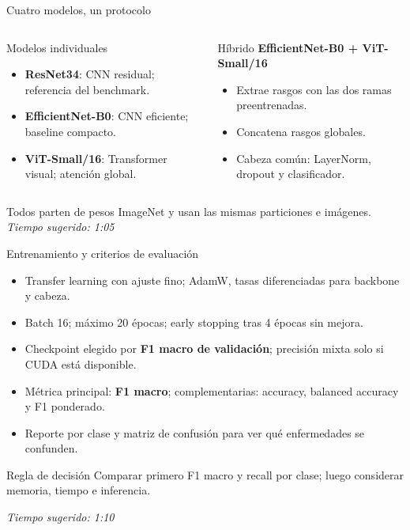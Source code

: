 \documentclass[aspectratio=169,11pt]{beamer}
\newcommand{\tiempo}[1]{\vfill\hfill\scriptsize\textit{Tiempo sugerido: #1}}
\begin{document}
\begin{frame}{Cuatro modelos, un protocolo}
    \begin{columns}[T]
        \begin{block}{Modelos individuales}
            \begin{itemize}
                \item \textbf{ResNet34}: CNN residual; referencia del benchmark.
                \item \textbf{EfficientNet-B0}: CNN eficiente; baseline compacto.
                \item \textbf{ViT-Small/16}: Transformer visual; atención global.
            \end{itemize}
        \end{block}
        \begin{block}{Híbrido}
            \textbf{EfficientNet-B0 + ViT-Small/16}
            \begin{itemize}
                \item Extrae rasgos con las dos ramas preentrenadas.
                \item Concatena rasgos globales.
                \item Cabeza común: LayerNorm, dropout y clasificador.
            \end{itemize}
        \end{block}
    \end{columns}
    \vspace{0.2cm}
    Todos parten de pesos ImageNet y usan las mismas particiones e imágenes.
    \tiempo{1:05}
\end{frame}

\begin{frame}{Entrenamiento y criterios de evaluación}
    \begin{itemize}
        \item Transfer learning con ajuste fino; AdamW, tasas diferenciadas para backbone y cabeza.
        \item Batch 16; máximo 20 épocas; early stopping tras 4 épocas sin mejora.
        \item Checkpoint elegido por \textbf{F1 macro de validación}; precisión mixta solo si CUDA está disponible.
        \item Métrica principal: \textbf{F1 macro}; complementarias: accuracy, balanced accuracy y F1 ponderado.
        \item Reporte por clase y matriz de confusión para ver qué enfermedades se confunden.
    \end{itemize}
    \begin{block}{Regla de decisión}
        Comparar primero F1 macro y recall por clase; luego considerar memoria, tiempo e inferencia.
    \end{block}
    \tiempo{1:10}
\end{frame}
\end{document}
